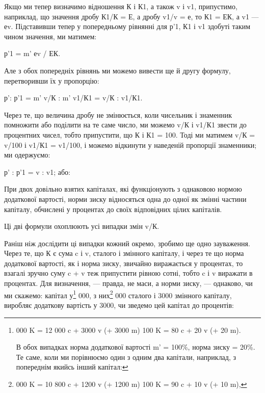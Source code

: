 Якщо ми тепер визначимо відношення К і К1, а також
v і v1, припустимо, наприклад, що значення дробу К1/К = Е, а дробу
v1/v = е, то К1 = ЕК, а v1 — еv. Підставивши тепер у попередньому
рівнянні для р'1, К1 і v1 здобуті таким чином значення,
ми матимем:

р'1 = m' еv / ЕК.

Але з обох попередніх рівнянь ми можемо вивести ще й другу
формулу, перетворивши їх у пропорцію:

р': р'1 = m' v/К : m' v1/К1 = v/К : v1/К1.

Через те, що величина дробу не змінюється, коли чисельник
і знаменник помножити або поділити на те саме число, ми можемо
v/К і v1/К1 звести до процентних чисел, тобто припустити, що
К і К1 = 100. Тоді ми матимем v/К = v/100 і v1/К1 = v1/100, і можемо відкинути
у наведеній пропорції знаменники; ми одержуємо:

р' : р'1 = v : v1; або:

При двох довільно взятих капіталах, які функціонують з однаковою
нормою додаткової вартості, норми зиску відносяться
одна до одної як змінні частини капіталу, обчислені у процентах
до своїх відповідних цілих капіталів.

Ці дві формули охоплюють усі випадки змін v/К.

Раніш ніж дослідити ці випадки кожний окремо, зробимо
ще одно зауваження. Через те, що К є сума c і v, сталого і змінного
капіталу, і через те що норма додаткової вартості, як
і норма зиску, звичайно виражається у процентах, то взагалі
зручно суму c + v теж припустити рівною сотні, тобто c і v
виражати в процентах. Для визначення, — правда, не маси, а
норми зиску, — однаково, чи ми скажемо: капітал у\footnote{
000 K = 12 000 c + 3000 v (+ 3000 m)
100 K = 80 c + 20 v (+ 20 m).

В обох випадках норма додаткової вартості m' = 100\%, норма
зиску = 20\%.
Те саме, коли ми порівнюємо один з одним два капітали,
наприклад, з попереднім якийсь інший капітал:
} 000,
з них\footnote{
000 K = 10 800 c + 1200 v (+ 1200 m)
100 K = 90 c + 10 v (+ 10 m),
} 000 сталого і 3000 змінного капіталу, виробляє додаткову
вартість у 3000, чи зведемо цей капітал до процентів: